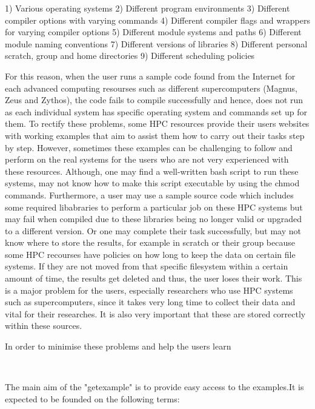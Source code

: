 \begin{Document}
{\begin{Introduction}
1) Various operating systems 
2) Different program environments
3) Different compiler options with varying commands
4) Different compiler flags and wrappers for varying compiler options
5) Different module systems and paths
6) Different module naming conventions
7) Different versions of libraries
8) Different personal scratch, group and home directories
9) Different scheduling policies

For this reason, when the user runs a sample code found from the Internet for each advanced computing resourses such as different supercomputers (Magnus,
Zeus and Zythos), the code fails to compile successfully and hence, does not run as each individual system has specific operating system and 
commands set up for them. To rectify these problems, some HPC resources provide their users websites with working examples that aim to assist them how to
carry out their tasks step by step. However, sometimes these examples can be challenging to follow and perform on the real systems for the users who are 
not very experienced with these resources. Although, one may find a well-written bash script to run these systems, may not know how to make this script
executable by using the chmod commands. Furthermore, a user may use a sample source code which includes some required libabraries to perform a particular
job on these HPC systems but may fail when compiled due to these libraries being no longer valid or upgraded to a different version. Or one may complete 
their task successfully, but may not know where to store the results, for example in scratch or their group because some HPC recourses have policies on 
how long to keep the data on certain file systems. If they are not moved from that specific filesystem within a certain amount of time, the results get
deleted and thus, the user loses their work. This is a major problem for the users, especially researchers who use HPC systems such as supercomputers,
since it takes very long time to collect their data and vital for their researches. It is also very important that these are stored correctly within
these sources.

In order to minimise these problems and help the users learn 




 





\end{Introduction}
\
\

The main aim of the "getexample" is to provide easy access to the examples.It is expected to be founded on the following terms:

}
\end{Document}

